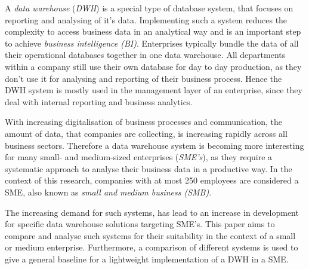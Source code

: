 \documentclass[../paper.tex]{subfiles}
\begin{document}
A \textit{data warehouse} (\textit{DWH}) is a special type of database system, that focuses on reporting and analysing of it's data. Implementing such a system reduces the complexity to access business data in an analytical way and is an important step to achieve \textit{business intelligence (BI)}. Enterprises typically bundle the data of all their operational databases together in one data warehouse. All departments within a company still use their own database for day to day production, as they don't use it for analysing and reporting of their business process. Hence the DWH system is mostly used in the management layer of an enterprise, since they deal with internal reporting and business analytics.

With increasing digitalisation of business processes and communication, the amount of data, that companies are collecting, is increasing rapidly across all business sectors. Therefore a data warehouse system is becoming more interesting for many small- and medium-sized enterprises (\textit{SME's}), as they require a systematic approach to analyse their business data in a productive way. In the context of this research, companies with at most 250 employees are considered a SME, also known as \textit{small and medium business (SMB)}.

The increasing demand for such systems, has lead to an increase in development for specific data warehouse solutions targeting SME's. This paper aims to compare and analyse such systems for their suitability in the context of a small or medium enterprise. Furthermore, a comparison of different systems is used to give a general baseline for a lightweight implementation of a DWH in a SME.
\end{document}
